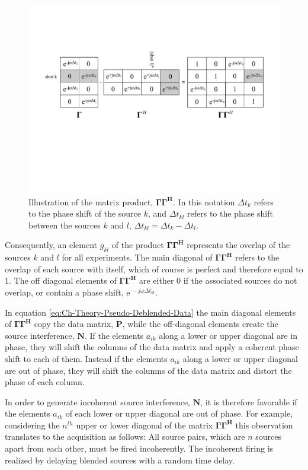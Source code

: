 \begin{figure}
	\centering
	\includegraphics[width = \textwidth]{Plots/GGH}
	\caption{Illustration of the matrix product, $\mathbf{\Gamma \Gamma^H}$. In this notation $\Delta t_k$ refers to the phase shift of the source $k$, and $\Delta t_{kl}$ refers to the phase shift between the sources $k$ and $l$, $\Delta t_{kl} = \Delta t_k - \Delta t_l$.}
	\label{fig:Ch-Theory-GGH}
\end{figure}

Consequently, an element $g_{kl}$ of the product $\mathbf{\Gamma \Gamma ^H}$ represents the overlap of the sources $k$ and $l$ for all experiments. The main diagonal of $\mathbf{\Gamma \Gamma ^H}$ refers to the overlap of each source with itself, which of course is perfect and therefore equal to 1. The off diagonal elements of $\mathbf{\Gamma \Gamma ^H}$ are either 0 if the associated sources do not overlap, or contain a phase shift, $\mathrm{e}^{\, -j \omega \Delta t_{kl}}$.
  

In equation \ref{eq:Ch-Theory-Pseudo-Deblended-Data} the main diagonal elements of $\mathbf{\Gamma \Gamma ^H}$ copy the data matrix, $\mathbf{P}$, while the off-diagonal elements create the source interference, $\mathbf{N}$. If the elements $a_{ik}$ along a lower or upper diagonal are in phase, they will shift the columns of the data matrix and apply a coherent phase shift to each of them. Instead if the elements $a_{ik}$ along a lower or upper diagonal are out of phase, they will shift the columns of the data matrix and distort the phase of each column. 

In order to generate incoherent source interference, $\mathbf{N}$, it is therefore favorable if the elements $a_{ik}$ of each lower or upper diagonal are out of phase. For example, considering the $n^{th}$ upper or lower diagonal of the matrix $\mathbf{\Gamma \Gamma^H}$ this observation translates to the acquisition as follows: All source pairs, which are $n$ sources apart from each other, must be fired incoherently. The incoherent firing is realized by delaying blended sources with a random time delay.

